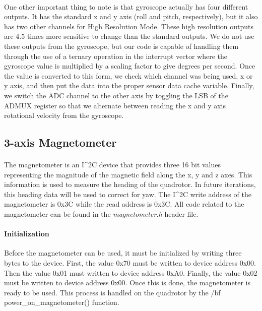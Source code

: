\paragraph{}
One other important thing to note is that gyroscope actually has four different outputs.  It has the standard x and y axis (roll and pitch, respectively), but it also has two other channels for High Resolution Mode.  These high resolution outputs are 4.5 times more sensitive to change than the standard outputs.  We do not use these outputs from the gyroscope, but our code is capable of handling them through the use of a ternary operation in the interrupt vector where the gyroscope value is multiplied by a scaling factor to give degrees per second.  Once the value is converted to this form, we check which channel was being used, x or y axis, and then put the data into the proper sensor data cache variable.  Finally, we switch the ADC channel to the other axis by toggling the LSB of the ADMUX register so that we alternate between reading the x and y axis rotational velocity from the gyroscope.

\subsection{3-axis Magnetometer}

\paragraph{}
The magnetometer is an I^{2}C device that provides three 16 bit values representing the magnitude of the magnetic field along the x, y and z axes.  This information is used to measure the heading of the quadrotor.  In future iterations, this heading data will be used to correct for yaw.  The I^{2}C write address of the magnetometer is 0x3C while the read address is 0x3C.  All code related to the magnetometer can be found in the {\it magnetometer.h} header file.

\paragraph{Initialization}
Before the magnetometer can be used, it must be initialized by writing three bytes to the device.  First, the value 0x70 must be written to device address 0x00.  Then the value 0x01 must written to device address 0xA0.  Finally, the value 0x02 must be written to device address 0x00.  Once this is done, the magnetometer is ready to be used.  This process is handled on the quadrotor by the {/bf power_on_magnetometer()} function.

